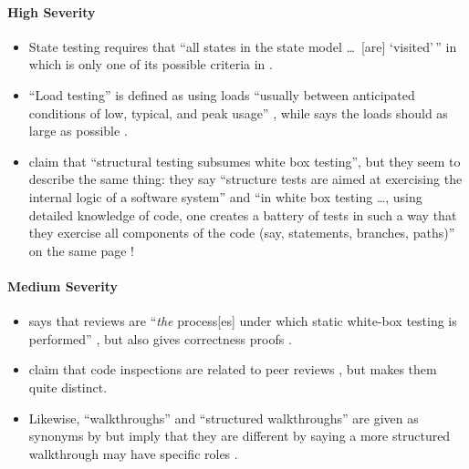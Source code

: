 \paragraph{High Severity}
\begin{itemize}
      \item %
            State testing requires that ``all states in the state model
            \dots\ [are] `visited'\,'' in \citep[p.~19]{IEEE2021} which
            is only one of its possible criteria in \citep[pp.~82-83]{Patton2006}.
      \item %
            ``Load testing'' is defined as using loads ``usually between
            anticipated conditions of low, typical, and peak usage''
            \citep[p.~5]{IEEE2022}, while \citeauthor{Patton2006} says the
            loads should as large as possible \citeyearpar[p.~86]{Patton2006}.
      \item %
            \citeauthor{PetersAndPedrycz2000} claim that ``structural testing
            subsumes white box testing'', but they seem to describe the same
            thing: they say ``structure tests are aimed at exercising the
            internal logic of a software system'' and ``in white box testing
            \dots, using detailed knowledge of code, one creates a battery of
            tests in such a way that they exercise all components of the code
            (say, statements, branches, paths)'' on the same page
            \citeyearpar[p.~447]{PetersAndPedrycz2000}!
\end{itemize}

\paragraph{Medium Severity}
\begin{itemize}
      \item %
            \citeauthor{Patton2006} says that reviews are ``\emph{the} process[es]
            under which static white-box testing is performed''
            \citeyearpar[p.~92, emphasis added]{Patton2006}, but
            \citeauthor{vanVliet2000} also gives correctness proofs
            \citeyearpar[pp.~418-419]{vanVliet2000}.
      \item %
            \citeauthor{ISTQB_author} claim that code inspections are
            related to peer reviews \citeyearpar{ISTQB}, but
            \citet[pp.~94-95]{Patton2006} makes them quite distinct.
      \item %
             \label{walkthrough-syns}
            Likewise, ``walkthroughs'' and ``structured walkthroughs''
            are given as synonyms by \citetISTQB{} but
            \citeauthor{PetersAndPedrycz2000} imply that they are
            different by saying a more structured walkthrough may have
            specific roles \citeyearpar[p.~484]{PetersAndPedrycz2000}.
\end{itemize}

